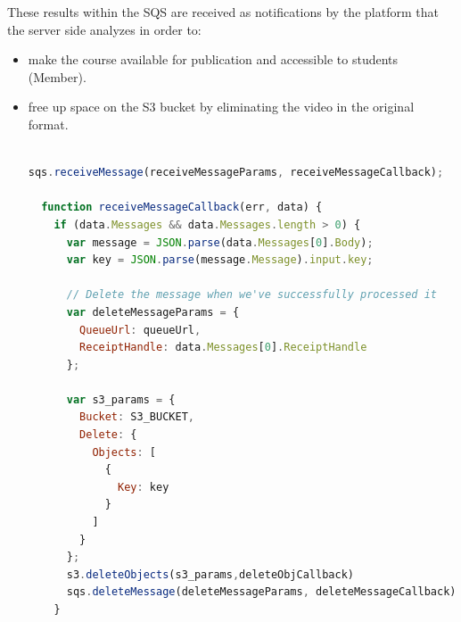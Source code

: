 These results within the SQS are received as notifications by the platform that the server side analyzes in order to:


\begin{itemize}
\item make the course available for publication and accessible to students (Member).

\item free up space on the S3 bucket by eliminating the video in the original format.

\begin{lstlisting}[language=javascript]

sqs.receiveMessage(receiveMessageParams, receiveMessageCallback);

  function receiveMessageCallback(err, data) {
    if (data.Messages && data.Messages.length > 0) {
      var message = JSON.parse(data.Messages[0].Body);
      var key = JSON.parse(message.Message).input.key;
      
      // Delete the message when we've successfully processed it
      var deleteMessageParams = {
        QueueUrl: queueUrl,
        ReceiptHandle: data.Messages[0].ReceiptHandle
      };

      var s3_params = {
        Bucket: S3_BUCKET,
        Delete: { 
          Objects: [ 
            {
              Key: key
            }
          ]
        }
      };
      s3.deleteObjects(s3_params,deleteObjCallback)
      sqs.deleteMessage(deleteMessageParams, deleteMessageCallback);
    }
    \end{lstlisting}

\end{itemize}




